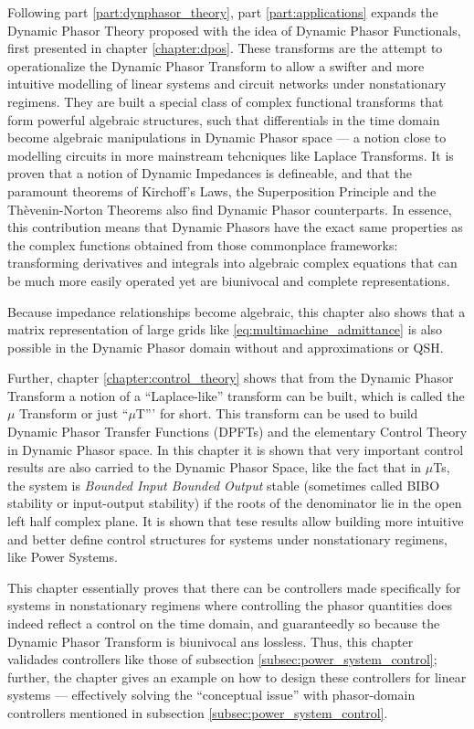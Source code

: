 	Following part \ref{part:dynphasor_theory}, part \ref{part:applications} expands the Dynamic Phasor Theory proposed with the idea of Dynamic Phasor Functionals, first presented in chapter \ref{chapter:dpos}. These transforms are the attempt to operationalize the Dynamic Phasor Transform to allow a swifter and more intuitive modelling of linear systems and circuit networks under nonstationary regimens. They are built a special class of complex functional transforms that form powerful algebraic structures, such that differentials in the time domain become algebraic manipulations in Dynamic Phasor space — a notion close to modelling circuits in more mainstream tehcniques like Laplace Transforms. It is proven that a notion of Dynamic Impedances is defineable, and that the paramount theorems of Kirchoff's Laws, the Superposition Principle and the Thèvenin-Norton Theorems also find Dynamic Phasor counterparts. In essence, this contribution means that Dynamic Phasors have the exact same properties as the complex functions obtained from those commonplace frameworks: transforming derivatives and integrals into algebraic complex equations that can be much more easily operated yet are biunivocal and complete representations.

	Because impedance relationships become algebraic, this chapter also shows that a matrix representation of large grids like \eqref{eq:multimachine_admittance} is also possible in the Dynamic Phasor domain without and approximations or QSH.

	Further, chapter \ref{chapter:control_theory} shows that from the Dynamic Phasor Transform a notion of a ``Laplace-like'' transform can be built, which is called the $\mu$ Transform or just ``$\mu$T''' for short. This transform can be used to build Dynamic Phasor Transfer Functions (DPFTs) and the elementary Control Theory in Dynamic Phasor space. In this chapter it is shown that very important control results are also carried to the Dynamic Phasor Space, like the fact that in $\mu$Ts, the system is \textit{Bounded Input Bounded Output} stable (sometimes called BIBO stability or input-output stability) if the roots of the denominator lie in the open left half complex plane. It is shown that tese results allow building more intuitive and better define control structures for systems under nonstationary regimens, like Power Systems.

	This chapter essentially proves that there can be controllers made specifically for systems in nonstationary regimens where controlling the phasor quantities does indeed reflect a control on the time domain, and guaranteedly so because the Dynamic Phasor Transform is biunivocal ans lossless. Thus, this chapter validades controllers like those of subsection \ref{subsec:power_system_control}; further, the chapter gives an example on how to design these controllers for linear systems — effectively solving the ``conceptual issue'' with phasor-domain controllers mentioned in subsection \ref{subsec:power_system_control}.

